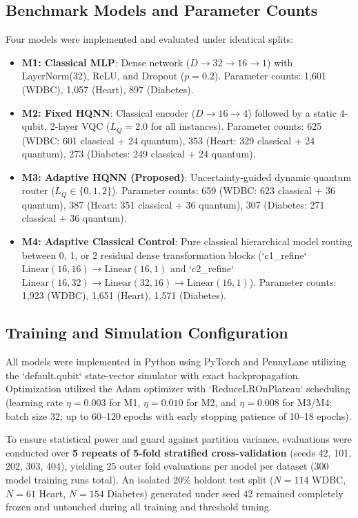 \documentclass[conference]{IEEEtran}
\begin{document}
\subsection{Benchmark Models and Parameter Counts}
Four models were implemented and evaluated under identical splits:
\begin{itemize}
    \item \textbf{M1: Classical MLP}: Dense network ($D \to 32 \to 16 \to 1$) with LayerNorm(32), ReLU, and Dropout ($p=0.2$). Parameter counts: 1,601 (WDBC), 1,057 (Heart), 897 (Diabetes).
    \item \textbf{M2: Fixed HQNN}: Classical encoder ($D \to 16 \to 4$) followed by a static 4-qubit, 2-layer VQC ($L_Q = 2.0$ for all instances). Parameter counts: 625 (WDBC: 601 classical + 24 quantum), 353 (Heart: 329 classical + 24 quantum), 273 (Diabetes: 249 classical + 24 quantum).
    \item \textbf{M3: Adaptive HQNN (Proposed)}: Uncertainty-guided dynamic quantum router ($L_Q \in \{0, 1, 2\}$). Parameter counts: 659 (WDBC: 623 classical + 36 quantum), 387 (Heart: 351 classical + 36 quantum), 307 (Diabetes: 271 classical + 36 quantum).
    \item \textbf{M4: Adaptive Classical Control}: Pure classical hierarchical model routing between 0, 1, or 2 residual dense transformation blocks (`c1\_refine` $\text{Linear}(16,16) \to \text{Linear}(16,1)$ and `c2\_refine` $\text{Linear}(16,32) \to \text{Linear}(32,16) \to \text{Linear}(16,1)$). Parameter counts: 1,923 (WDBC), 1,651 (Heart), 1,571 (Diabetes).
\end{itemize}

\subsection{Training and Simulation Configuration}
All models were implemented in Python using PyTorch and PennyLane \cite{bergholm2018pennylane} utilizing the `default.qubit` state-vector simulator with exact backpropagation. Optimization utilized the Adam optimizer with `ReduceLROnPlateau` scheduling (learning rate $\eta = 0.003$ for M1, $\eta = 0.010$ for M2, and $\eta = 0.008$ for M3/M4; batch size 32; up to 60--120 epochs with early stopping patience of 10--18 epochs). 

To ensure statistical power and guard against partition variance, evaluations were conducted over \textbf{5 repeats of 5-fold stratified cross-validation} (seeds 42, 101, 202, 303, 404), yielding 25 outer fold evaluations per model per dataset (300 model training runs total). An isolated 20\% holdout test split ($N=114$ WDBC, $N=61$ Heart, $N=154$ Diabetes) generated under seed 42 remained completely frozen and untouched during all training and threshold tuning.
\end{document}

